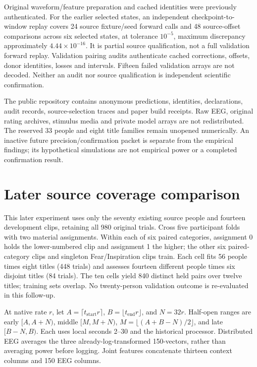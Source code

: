 \documentclass[10pt,a4paper]{article}
\begin{document}
Original waveform/feature preparation and cached identities were previously authenticated. For the earlier selected states, an independent checkpoint-to-window replay covers 24 source fixture/seed forward calls and 48 source-offset comparisons across six selected states, at tolerance \(10^{-5}\), maximum discrepancy approximately \(4.44\times10^{-16}\). It is partial source qualification, not a full validation forward replay. Validation pairing audits authenticate cached corrections, offsets, donor identities, losses and intervals. Fifteen failed validation arrays are not decoded. Neither an audit nor source qualification is independent scientific confirmation.

The public repository contains anonymous predictions, identities, declarations, audit records, source-selection traces and paper build receipts. Raw EEG, original rating archives, stimulus media and private model arrays are not redistributed. The reserved 33 people and eight title families remain unopened numerically. An inactive future precision/confirmation packet is separate from the empirical findings; its hypothetical simulations are not empirical power or a completed confirmation result.

\section{Later source coverage comparison}
This later experiment uses only the seventy existing source people and fourteen development clips, retaining all 980 original trials. Cross five participant folds with two material assignments. Within each of six paired categories, assignment 0 holds the lower-numbered clip and assignment 1 the higher; the other six paired-category clips and singleton Fear/Inspiration clips train. Each cell fits 56 people times eight titles (448 trials) and assesses fourteen different people times six disjoint titles (84 trials). The ten cells yield 840 distinct held pairs over twelve titles; training sets overlap. No twenty-person validation outcome is re-evaluated in this follow-up.

At native rate \(r\), let \(A=\lceil t_\mathrm{start}r\rceil\), \(B=\lfloor t_\mathrm{end}r\rfloor\), and \(N=32r\). Half-open ranges are early \([A,A+N)\), middle \([M,M+N)\), \(M=\lfloor(A+B-N)/2\rfloor\), and late \([B-N,B)\). Each uses local seconds 2--30 and the historical processor. Distributed EEG averages the three already-log-transformed 150-vectors, rather than averaging power before logging. Joint features concatenate thirteen context columns and 150 EEG columns.
\end{document}
